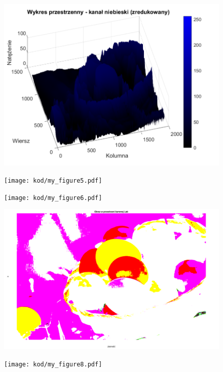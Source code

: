 \documentclass[10pt,a4paper,twoside,twocolumn]{article}%
\begin{document}
\begin{figure}[H]\centering\includegraphics[width=0.9\linewidth]{kod/my_figure4.pdf}\label{fig:my_figure4.pdf}\end{figure}

\begin{figure}[H]\centering\texttt{[image: kod/my\_figure5.pdf]}\label{fig:my_figure5.pdf}\end{figure}

\begin{figure}[H]\centering\texttt{[image: kod/my\_figure6.pdf]}\label{fig:my_figure6.pdf}\end{figure}

\begin{figure}[H]\centering\includegraphics[width=0.9\linewidth]{kod/my_figure7.pdf}\label{fig:my_figure7.pdf}\end{figure}

\begin{figure}[H]\centering\texttt{[image: kod/my\_figure8.pdf]}\label{fig:my_figure8.pdf}\end{figure}
\end{document}
